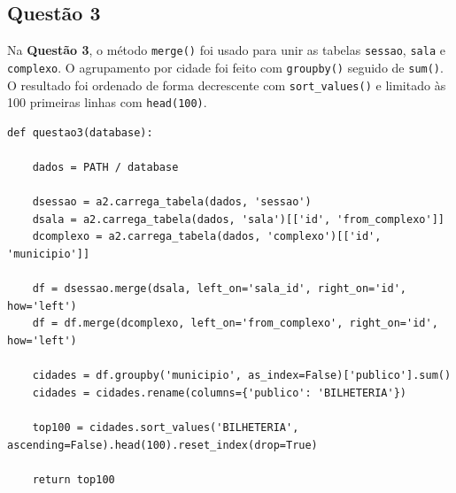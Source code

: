 \documentclass{article}
\begin{document}
\linespread{1.5}
\pagebreak
\subsection*{Questão 3}
Na \textbf{Questão 3}, o método \texttt{merge()} foi usado para unir as tabelas \texttt{sessao}, \texttt{sala} e \texttt{complexo}. O agrupamento por cidade foi feito com \texttt{groupby()} seguido de \texttt{sum()}. O resultado foi ordenado de forma decrescente com \texttt{sort\_values()} e limitado às 100 primeiras linhas com \texttt{head(100)}.
\linespread{1}
\begin{lstlisting}
def questao3(database):

    dados = PATH / database
    
    dsessao = a2.carrega_tabela(dados, 'sessao')
    dsala = a2.carrega_tabela(dados, 'sala')[['id', 'from_complexo']]
    dcomplexo = a2.carrega_tabela(dados, 'complexo')[['id', 'municipio']]

    df = dsessao.merge(dsala, left_on='sala_id', right_on='id', how='left')
    df = df.merge(dcomplexo, left_on='from_complexo', right_on='id', how='left')

    cidades = df.groupby('municipio', as_index=False)['publico'].sum()
    cidades = cidades.rename(columns={'publico': 'BILHETERIA'})

    top100 = cidades.sort_values('BILHETERIA', ascending=False).head(100).reset_index(drop=True)

    return top100
\end{lstlisting}
\linespread{1.5}
\end{document}
